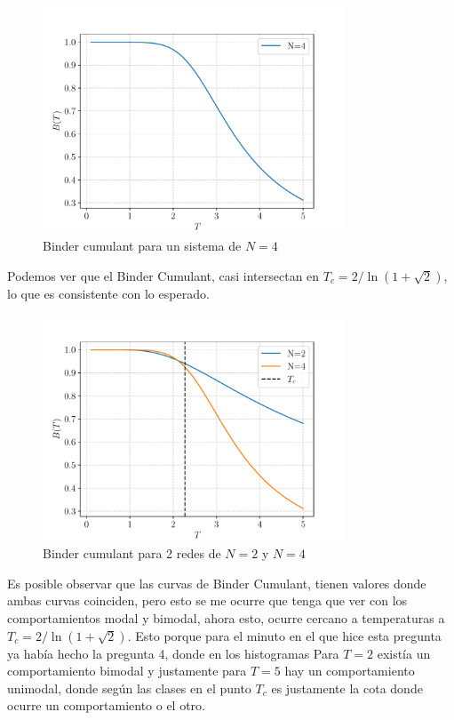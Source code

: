 \documentclass[11pt,a4paper]{article}
\begin{document}
\begin{figure}[H]
    \centering
    \includegraphics[width=0.8\textwidth]{p2/N4_binder.pdf}
    \caption{Binder cumulant para un sistema de $N=4$}
    \label{fig:p2_8}
\end{figure}
Podemos ver que el Binder Cumulant, casi intersectan en $T_c = 2/\ln{(1+\sqrt{2})}$, lo que es consistente con lo esperado.
\begin{figure}[H]
    \centering
    \includegraphics[width=0.8\textwidth]{p2/all_binder.pdf}
    \caption{Binder cumulant para 2 redes de $N=2$ y $N=4$}
    \label{fig:p2_8}
\end{figure}
Es posible observar que las curvas de Binder Cumulant, tienen valores donde ambas curvas coinciden, pero esto se me ocurre que tenga que ver con los comportamientos modal y bimodal, 
ahora esto, ocurre cercano a temperaturas a $T_c = 2/\ln{(1+\sqrt{2})}$. Esto porque para el minuto en el que hice esta pregunta ya había hecho la pregunta 4, donde en los histogramas Para
$T = 2$ existía un comportamiento bimodal y justamente para $T = 5$ hay un comportamiento unimodal, donde según las clases en el punto $T_c$ es justamente la cota donde ocurre un comportamiento o el otro. 
\end{document}
